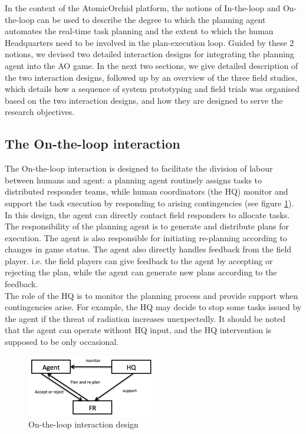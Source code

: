 In the context of the AtomicOrchid platform, the notions of In-the-loop and On-the-loop can be used to describe the degree to which the planning agent automates the real-time task planning and the extent to which the human Headquarters need to be involved in the plan-execution loop. Guided by these 2 notions, we devised two detailed interaction designs for integrating the planning agent into the \ac{AO} game. In the next two sections, we give detailed description of the two interaction designs, followed up by an overview of the three field studies, which details how a sequence of system prototyping  and field trials was organised based on the two interaction designs, and how they are designed to serve the research objectives.\\

\subsection{The On-the-loop interaction}
The On-the-loop interaction is designed to facilitate the division of labour between humans and agent: a planning agent routinely assigns tasks to distributed responder teams, while human coordinators (the HQ) monitor and support the task execution by responding to arising contingencies (see figure \ref{fig:OnTheLoop}). In this design, the agent can directly contact field responders to allocate tasks. The responsibility of the planning agent is to generate and distribute plans for execution. The agent is also responsible for initiating re-planning according to changes in game status. The agent also directly handles feedback from the field player. i.e. the field players can give feedback to the agent by accepting or rejecting the plan, while the agent can generate new plans according to the feedback. \\

The role of the HQ is to monitor the planning process and provide support when contingencies arise. For example, the HQ may decide to stop some tasks issued by the agent if the threat of radiation increases unexpectedly. It should be noted that the agent can operate without HQ input, and the HQ intervention is supposed to be only occasional. \\

\begin{figure}[h]
  \centering
  \includegraphics[width=0.5\textwidth]{img/approach/OnTheLoop}
  \caption{On-the-loop interaction design}
  \label{fig:OnTheLoop}
\end{figure}

